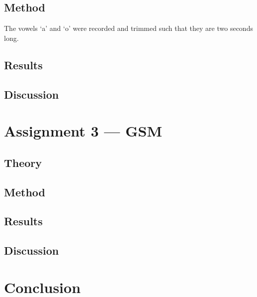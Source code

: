 \documentclass{IEEEtran}
\begin{document}
\subsection{Method}
The vowels `a' and `o' were recorded and trimmed such that they are two seconds
long.

\subsection{Results}
\subsection{Discussion}

\section{Assignment 3 --- GSM}

\subsection{Theory}
\subsection{Method}
\subsection{Results}
\subsection{Discussion}

\section{Conclusion}
\end{document}
